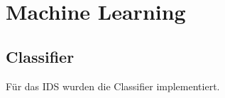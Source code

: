 \documentclass[main.tex]{subfiles}
\begin{document}
\section{Machine Learning}
\subsection{Classifier}
Für das IDS wurden die Classifier implementiert.
\end{document}
